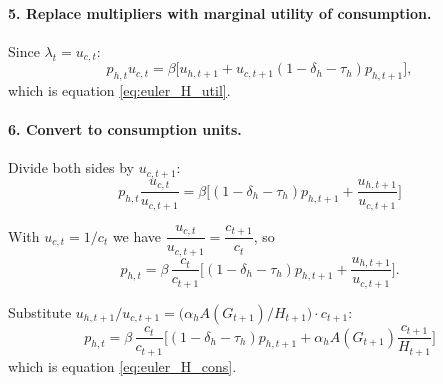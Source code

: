 \paragraph{5. Replace multipliers with marginal utility of consumption.}
Since $\lambda_t=u_{c,t}$:
\[
p_{h,t}u_{c,t}
=
\beta\Big[u_{h,t+1} + u_{c,t+1}(1-\delta_h-\tau_h)p_{h,t+1}\Big],
\]
which is equation \eqref{eq:euler_H_util}.

\paragraph{6. Convert to consumption units.}
Divide both sides by $u_{c,t+1}$:
\[
p_{h,t}\frac{u_{c,t}}{u_{c,t+1}}
=
\beta\Big[
(1-\delta_h-\tau_h)p_{h,t+1} + \frac{u_{h,t+1}}{u_{c,t+1}}
\Big]
\]

With $u_{c,t}=1/c_t$ we have $\dfrac{u_{c,t}}{u_{c,t+1}}=\dfrac{c_{t+1}}{c_t}$, so
\[
p_{h,t}
=
\beta\,\frac{c_t}{c_{t+1}}
\Big[
(1-\delta_h-\tau_h)p_{h,t+1} + \frac{u_{h,t+1}}{u_{c,t+1}}
\Big].
\]

Substitute $u_{h,t+1}/u_{c,t+1}
= \bigl(\alpha_h A(G_{t+1})/H_{t+1}\bigr) \cdot c_{t+1}$:
\[
p_{h,t}
=
\beta\,\frac{c_t}{c_{t+1}}
\Big[
(1-\delta_h-\tau_h)p_{h,t+1}
+ \alpha_h A(G_{t+1})\frac{c_{t+1}}{H_{t+1}}
\Big]
\]
which is equation \eqref{eq:euler_H_cons}.



